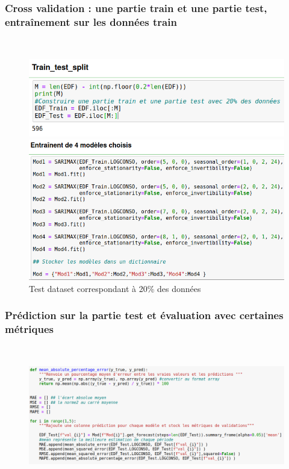 \documentclass{beamer}
\theoremstyle{definition}
\begin{document}
\begin{frame}
	\frametitle{Cross validation : une partie train et une partie test, entraînement sur les données train}
	\begin{minipage}[t]{1\linewidth}
		\centering\hfill\\[-0.5cm]
		\begin{figure}	
		\includegraphics[width=0.6\linewidth]{28.png}	
		\caption*{Test dataset correspondant à 20\% des données}
		
		\includegraphics[width=0.6\linewidth]{29.png}		
				
				
		\end{figure}
	\end{minipage}	
\end{frame}

\begin{frame}
	\frametitle{Prédiction sur la partie test et évaluation avec certaines métriques}
	\begin{minipage}[t]{1\linewidth}
		\centering\hfill\\[-0.5cm]
		\begin{figure}	
			\includegraphics[width=1\linewidth]{30.png}	
			\caption*{}
			
		\end{figure}
	\end{minipage}	
\end{frame}
\end{document}
